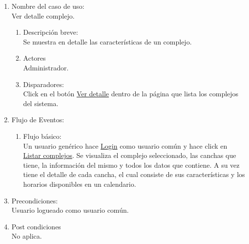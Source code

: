 \documentclass[a4paper,11pt]{article}
\begin{document}
\begin{enumerate}

    \item Nombre del caso de uso: \\
    Ver detalle complejo.

    \begin{enumerate}
    \item Descripción breve: \\
        Se muestra en detalle las características de un complejo.
    \item Actores \\
        Administrador.
    \item Disparadores: \\
        Click en el botón \underline{Ver detalle} dentro de la
        página que lista los complejos del sistema.
    \end{enumerate}

    \item Flujo de Eventos: \\

    \begin{enumerate}

        \item Flujo básico:\\
            Un usuario genérico hace \underline{Login} como usuario común y
            hace click en \underline{Listar complejos}. Se visualiza el
            complejo seleccionado, las canchas que tiene, la información del
            mismo y todos los datos que contiene. A su vez tiene el detalle de
            cada cancha, el cual consiste de sus características y los horarios
            disponibles en un calendario.


    \end{enumerate}

    \item Precondiciones: \\
        Usuario logueado como usuario común.

    \item Post condiciones \\
        No aplica.

\end{enumerate}

\end{document}
